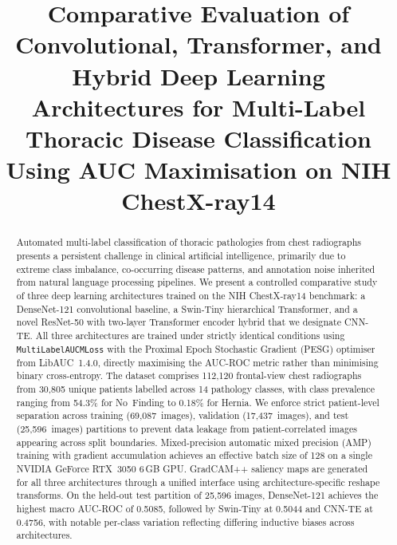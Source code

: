 \documentclass[conference]{IEEEtran}
\begin{document}
\title{Comparative Evaluation of Convolutional, Transformer, and Hybrid
Deep Learning Architectures for Multi-Label Thoracic Disease
Classification Using AUC Maximisation on NIH ChestX-ray14}

\author{
\and
{}
\and
}


\maketitle

\begin{abstract}
Automated multi-label classification of thoracic pathologies from
chest radiographs presents a persistent challenge in clinical artificial
intelligence, primarily due to extreme class imbalance, co-occurring
disease patterns, and annotation noise inherited from natural language
processing pipelines. We present a controlled comparative study of three
deep learning architectures trained on the NIH ChestX-ray14 benchmark:
a DenseNet-121 convolutional baseline, a Swin-Tiny hierarchical
Transformer, and a novel ResNet-50 with two-layer Transformer encoder
hybrid that we designate CNN-TE. All three architectures are trained
under strictly identical conditions using \texttt{MultiLabelAUCMLoss}
with the Proximal Epoch Stochastic Gradient (PESG) optimiser from
LibAUC~1.4.0, directly maximising the AUC-ROC metric rather than
minimising binary cross-entropy. The dataset comprises 112,120
frontal-view chest radiographs from 30,805 unique patients labelled
across 14 pathology classes, with class prevalence ranging from 54.3\%
for No~Finding to 0.18\% for Hernia. We enforce strict patient-level
separation across training (69,087~images), validation (17,437~images),
and test (25,596~images) partitions to prevent data leakage from
patient-correlated images appearing across split boundaries.
Mixed-precision automatic mixed precision (AMP) training with gradient
accumulation achieves an effective batch size of 128 on a single NVIDIA
GeForce RTX~3050 6\,GB GPU. GradCAM++ saliency maps are generated for
all three architectures through a unified interface using
architecture-specific reshape transforms. On the held-out test
partition of 25,596 images, DenseNet-121 achieves the highest macro
AUC-ROC of 0.5085, followed by Swin-Tiny at 0.5044 and CNN-TE at
0.4756, with notable per-class variation reflecting differing
inductive biases across architectures.
\end{abstract}
\end{document}
